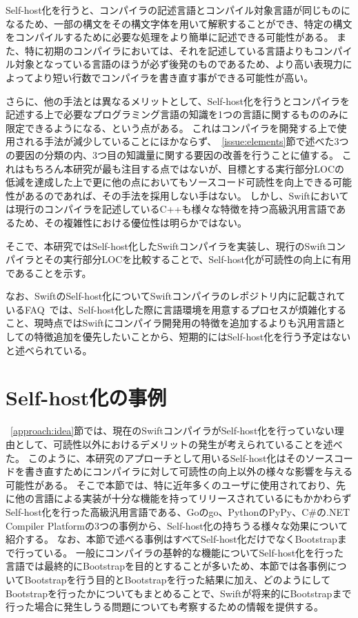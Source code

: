 Self-host化を行うと、コンパイラの記述言語とコンパイル対象言語が同じものになるため、一部の構文をその構文字体を用いて解釈することができ、特定の構文をコンパイルするために必要な処理をより簡単に記述できる可能性がある。
また、特に初期のコンパイラにおいては、それを記述している言語よりもコンパイル対象となっている言語のほうが必ず後発のものであるため、より高い表現力によってより短い行数でコンパイラを書き直す事ができる可能性が高い。

さらに、他の手法とは異なるメリットとして、Self-host化を行うとコンパイラを記述する上で必要なプログラミング言語の知識を1つの言語に関するもののみに限定できるようになる、という点がある。
これはコンパイラを開発する上で使用される手法が減少していることにほかならず、~\ref{issue:elements}節で述べた3つの要因の分類の内、3つ目の知識量に関する要因の改善を行うことに値する。
これはもちろん本研究が最も注目する点ではないが、目標とする実行部分LOCの低減を達成した上で更に他の点においてもソースコード可読性を向上できる可能性があるのであれば、その手法を採用しない手はない。
しかし、Swiftにおいては現行のコンパイラを記述しているC++も様々な特徴を持つ高級汎用言語であるため、その複雑性における優位性は明らかではない。

そこで、本研究ではSelf-host化したSwiftコンパイラを実装し、現行のSwiftコンパイラとその実行部分LOCを比較することで、Self-host化が可読性の向上に有用であることを示す。

なお、SwiftのSelf-host化についてSwiftコンパイラのレポジトリ内に記載されているFAQ~\cite{swift-faq}では、Self-host化した際に言語環境を用意するプロセスが煩雑化すること、現時点ではSwiftにコンパイラ開発用の特徴を追加するよりも汎用言語としての特徴追加を優先したいことから、短期的にはSelf-host化を行う予定はないと述べられている。

\section{Self-host化の事例}
\label{side-effect:instance}

~\ref{approach:idea}節では、現在のSwiftコンパイラがSelf-host化を行っていない理由として、可読性以外におけるデメリットの発生が考えられていることを述べた。
このように、本研究のアプローチとして用いるSelf-host化はそのソースコードを書き直すためにコンパイラに対して可読性の向上以外の様々な影響を与える可能性がある。
そこで本節では、特に近年多くのユーザに使用されており、先に他の言語による実装が十分な機能を持ってリリースされているにもかかわらずSelf-host化を行った高級汎用言語である、Goのgo、PythonのPyPy、C\#の.NET Compiler Platformの3つの事例から、Self-host化の持ちうる様々な効果について紹介する。
なお、本節で述べる事例はすべてSelf-host化だけでなくBootstrapまで行っている。
一般にコンパイラの基幹的な機能についてSelf-host化を行った言語では最終的にBootstrapを目的とすることが多いため、本節では各事例についてBootstrapを行う目的とBootstrapを行った結果に加え、どのようにしてBootstrapを行ったかについてもまとめることで、Swiftが将来的にBootstrapまで行った場合に発生しうる問題についても考察するための情報を提供する。

